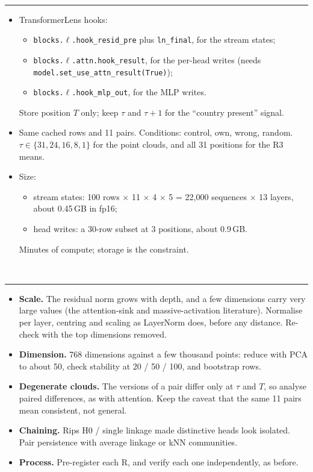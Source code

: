 \documentclass[10pt]{article}
\newcommand{\head}[1]{\par\vspace{5pt}{\large\bfseries #1}\\[-4pt]\rule{\linewidth}{0.5pt}\par}
\begin{document}
\head{Extraction plan (one run, GPT-2 small, CPU)}
\begin{itemize}
\item TransformerLens hooks:
  \begin{itemize}
  \item \texttt{blocks.$\ell$.hook\_resid\_pre} plus \texttt{ln\_final}, for the stream states;
  \item \texttt{blocks.$\ell$.attn.hook\_result}, for the per-head writes (needs \texttt{model.set\_use\_attn\_result(True)});
  \item \texttt{blocks.$\ell$.hook\_mlp\_out}, for the MLP writes.
  \end{itemize}
  Store position $T$ only; keep $\tau$ and $\tau{+}1$ for the ``country present'' signal.
\item Same cached rows and 11 pairs. Conditions: control, own, wrong, random. $\tau \in \{31, 24, 16, 8, 1\}$ for the
  point clouds, and all 31 positions for the R3 means.
\item Size:
  \begin{itemize}
  \item stream states: 100 rows $\times$ 11 $\times$ 4 $\times$ 5 = 22{,}000 sequences $\times$ 13 layers, about
    0.45\,GB in fp16;
  \item head writes: a 30-row subset at 3 positions, about 0.9\,GB.
  \end{itemize}
  Minutes of compute; storage is the constraint.
\end{itemize}

\head{Pitfalls (lessons from the head analyses)}
\begin{itemize}
\item \textbf{Scale.} The residual norm grows with depth, and a few dimensions carry very large values (the
  attention-sink and massive-activation literature). Normalise per layer, centring and scaling as LayerNorm does, before
  any distance. Re-check with the top dimensions removed.
\item \textbf{Dimension.} 768 dimensions against a few thousand points: reduce with PCA to about 50, check stability at
  20 / 50 / 100, and bootstrap rows.
\item \textbf{Degenerate clouds.} The versions of a pair differ only at $\tau$ and $T$, so analyse paired differences,
  as with attention. Keep the caveat that the same 11 pairs mean consistent, not general.
\item \textbf{Chaining.} Rips H0 / single linkage made distinctive heads look isolated. Pair persistence with average
  linkage or kNN communities.
\item \textbf{Process.} Pre-register each R, and verify each one independently, as before.
\end{itemize}
\end{document}
